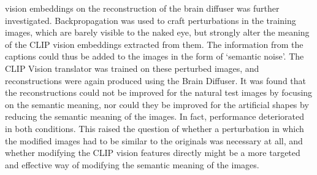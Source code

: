 vision embeddings on the reconstruction of the brain diffuser was further investigated. Backpropagation was used to craft perturbations in the training images, which are barely visible to the naked eye, but strongly alter the meaning of the CLIP vision embeddings extracted from them. The information from the captions could thus be added to the images in the form of `semantic noise'. The CLIP Vision translator was trained on these perturbed images, and reconstructions were again produced using the Brain Diffuser. It was found that the reconstructions could not be improved for the natural test images by focusing on the semantic meaning, nor could they be improved for the artificial shapes by reducing the semantic meaning of the images. In fact, performance deteriorated in both conditions. This raised the question of whether a perturbation in which the modified images had to be similar to the originals was necessary at all, and whether modifying the CLIP vision features directly might be a more targeted and effective way of modifying the semantic meaning of the images.

